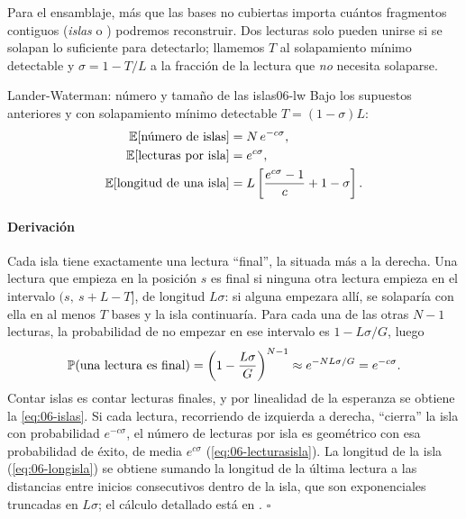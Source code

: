 Para el ensamblaje, más que las bases no cubiertas importa cuántos fragmentos contiguos (\emph{islas} o ) podremos reconstruir. Dos lecturas solo pueden unirse si se solapan lo suficiente para detectarlo; llamemos $T$ al solapamiento mínimo detectable y $\sigma = 1-T/L$ a la fracción de la lectura que \emph{no} necesita solaparse.

\begin{teorema}{Lander-Waterman: número y tamaño de las islas}{06-lw}
Bajo los supuestos anteriores y con solapamiento mínimo detectable $T=(1-\sigma)L$:
\begin{align}
\mathbb{E}[\text{número de islas}] &= N\,e^{-c\sigma},\label{eq:06-islas}\\
\mathbb{E}[\text{lecturas por isla}] &= e^{c\sigma},\label{eq:06-lecturasisla}\\
\mathbb{E}[\text{longitud de una isla}] &= L\left[\frac{e^{c\sigma}-1}{c} + 1 - \sigma\right].\label{eq:06-longisla}
\end{align}
\end{teorema}

\begin{simbolos}
\end{simbolos}

\paragraph{Derivación} Cada isla tiene exactamente una lectura ``final'', la situada más a la derecha. Una lectura que empieza en la posición $s$ es final si ninguna otra lectura empieza en el intervalo $(s,\ s+L-T]$, de longitud $L\sigma$: si alguna empezara allí, se solaparía con ella en al menos $T$ bases y la isla continuaría. Para cada una de las otras $N-1$ lecturas, la probabilidad de no empezar en ese intervalo es $1-L\sigma/G$, luego
\[
\mathbb{P}(\text{una lectura es final}) = \left(1-\frac{L\sigma}{G}\right)^{N-1} \approx e^{-NL\sigma/G} = e^{-c\sigma}.
\]
Contar islas es contar lecturas finales, y por linealidad de la esperanza se obtiene la \cref{eq:06-islas}. Si cada lectura, recorriendo de izquierda a derecha, ``cierra'' la isla con probabilidad $e^{-c\sigma}$, el número de lecturas por isla es geométrico con esa probabilidad de éxito, de media $e^{c\sigma}$ (\cref{eq:06-lecturasisla}). La longitud de la isla (\cref{eq:06-longisla}) se obtiene sumando la longitud de la última lectura a las distancias entre inicios consecutivos dentro de la isla, que son exponenciales truncadas en $L\sigma$; el cálculo detallado está en \textcite{c06-lander1988}. $\square$

